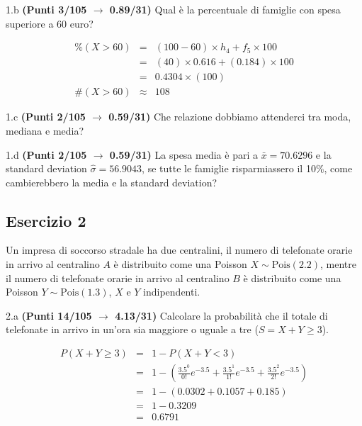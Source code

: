 \documentclass[
  11pt,
]{book}
\theoremstyle{mytheoremstyle}
\theoremstyle{mydefstyle}
\newenvironment{sol}
  {
  \begin{tcolorbox}[enhanced,breakable,arc=0.1mm,boxrule=1pt,colback=white,colframe=iblue,
  title=\bf \fontfamily{lmss}\selectfont \hspace{.5 cm} Soluzione,drop fuzzy shadow]

}{
\end{tcolorbox}
  }
\begin{document}
1.b \textbf{(Punti 3/105 \(\rightarrow\) 0.89/31)} Qual è la percentuale di famiglie con spesa superiore a 60 euro?

\begin{sol}
\begin{eqnarray*}
     \%(X> 60 ) &=& ( 100 - 60 )\times h_{ 4 }+ f_{ 5 }\times 100 \\
              &=& ( 40 )\times 0.616 + ( 0.184 )\times 100 \\
              &=&  0.4304 \times(100)\\
     \#(X> 60 ) &\approx& 108 
         \end{eqnarray*}

\end{sol}

1.c \textbf{(Punti 2/105 \(\rightarrow\) 0.59/31)} Che relazione dobbiamo attenderci tra moda, mediana e media?

1.d \textbf{(Punti 2/105 \(\rightarrow\) 0.59/31)} La spesa media è pari a \(\bar x=70.6296\) e la standard deviation \(\hat\sigma=56.9043\), se tutte le famiglie risparmiassero
il 10\%, come cambierebbero la media e la standard deviation?

\subsection{Esercizio 2}\label{esercizio-2-28}

Un impresa di soccorso stradale ha due centralini, il numero di telefonate orarie in arrivo
al centralino \(A\) è distribuito come una Poisson \(X\sim\text{Pois}(2.2)\), mentre
il numero di telefonate orarie in arrivo al centralino \(B\) è distribuito come una Poisson \(Y\sim\text{Pois}(1.3)\),
\(X\) e \(Y\) indipendenti.

2.a \textbf{(Punti 14/105 \(\rightarrow\) 4.13/31)} Calcolare la probabilità che il totale di telefonate in arrivo in un'ora sia maggiore
o uguale a tre (\(S=X+Y\ge 3\)).

\begin{sol}
\begin{eqnarray*}
   P( X+Y \geq 3 ) &=& 1-P( X+Y < 3 ) \\                 &=& 1-\left( \frac{ 3.5 ^{ 0 }}{ 0 !}e^{- 3.5 }+\frac{ 3.5 ^{ 1 }}{ 1 !}e^{- 3.5 }+\frac{ 3.5 ^{ 2 }}{ 2 !}e^{- 3.5 } \right)\\                 &=& 1-( 0.0302+0.1057+0.185 )\\                 &=& 1- 0.3209 \\                 &=&   0.6791 
\end{eqnarray*}

\end{sol}
\end{document}
